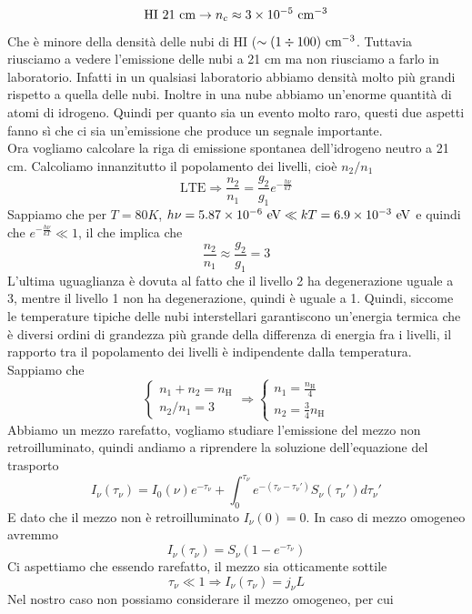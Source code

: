\begin{equation}
    \text{HI } 21\text{ cm} \to n_c\approx3\times10^{-5}\text{ cm}^{-3}
\end{equation}
Che è minore della densità delle nubi di HI ($\sim (1\div100)\text{ cm}^{-3}$. Tuttavia riusciamo a vedere l'emissione delle nubi a 21 cm ma non riusciamo a farlo in laboratorio. Infatti in un qualsiasi laboratorio abbiamo densità molto più grandi rispetto a quella delle nubi. Inoltre in una nube abbiamo un'enorme quantità di atomi di idrogeno. Quindi per quanto sia un evento molto raro, questi due aspetti fanno sì che ci sia un'emissione che produce un segnale importante.\\
Ora vogliamo calcolare la riga di emissione spontanea dell'idrogeno neutro a 21 cm. Calcoliamo innanzitutto il popolamento dei livelli, cioè $n_2/n_1$
\[
\text{LTE} \Rightarrow     \frac{n_2}{n_1}=\frac{g_2}{g_1}e^{-\frac{h\nu}{kT}}
\]
Sappiamo che per $T=80K$, $h\nu = 5.87\times10^{-6}\text{ eV}\ll kT=6.9\times10^{-3}\text{ eV}$ e quindi che $e^{-\frac{h\nu}{kT}}\ll1$, il che implica che
\[
\frac{n_2}{n_1}\approx\frac{g_2}{g_1}=3
\]
L'ultima uguaglianza è dovuta al fatto che il livello 2 ha degenerazione uguale a 3, mentre il livello 1 non ha degenerazione, quindi è uguale a 1. Quindi, siccome le temperature tipiche delle nubi interstellari garantiscono un'energia termica che è diversi ordini di grandezza più grande della differenza di energia fra i livelli, il rapporto tra il popolamento dei livelli è indipendente dalla temperatura.\\
Sappiamo che 
\[
    \begin{cases}
        n_1+n_2 = n_\text{H}\\
        n_2/n_1=3
    \end{cases}
    \Rightarrow
    \begin{cases}
        n_1=\frac{n_\text{H}}{4}\\
        n_2=\frac{3}{4}n_\text{H}
    \end{cases}
\]
Abbiamo un mezzo rarefatto, vogliamo studiare l'emissione del mezzo non retroilluminato, quindi andiamo a riprendere la soluzione dell'equazione del trasporto 
\[
    I_\nu(\tau_\nu)=I_0(\nu)e^{-\tau_\nu}+\int_{0}^{\tau_\nu}e^{-(\tau_\nu-\tau_\nu')}S_\nu(\tau_\nu')d\tau_\nu'
\]
E dato che il mezzo non è retroilluminato $I_\nu(0)=0$. In caso di mezzo omogeneo avremmo 
\[
    I_\nu(\tau_\nu)=S_\nu(1-e^{-\tau_\nu})
\]
Ci aspettiamo che essendo rarefatto, il mezzo sia otticamente sottile
\[
    \tau_\nu\ll1\Rightarrow I_\nu(\tau_\nu) = j_\nu L
\]
Nel nostro caso non possiamo considerare il mezzo omogeneo, per cui
